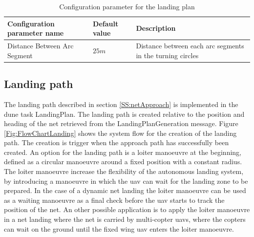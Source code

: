 \begin{table}[H]
\centering
\begin{tabular}{| p{5cm} | p{1cm} | p{5cm} |}
\hline
\textbf{Configuration parameter name}	& \textbf{Default value}	& \textbf{Description} \\ \hline
Distance Between Arc Segment			& $ 25 m$					& Distance between each arc segments in the turning circles \\ \hline
\end{tabular}
\caption{Configuration parameter for the landing plan}
\label{Tb:LandingPlanParameter}
\end{table}
\subsection{Landing path}
The landing path described in section \ref{SS:netApproach} is implemented in the \gls{dune} task LandingPlan. The landing path is created relative to the position and heading of the net retrieved from the LandingPlanGeneration message. Figure \ref{Fig:FlowChartLanding} shows the system flow for the creation of the landing path. The creation is trigger when the approach path has successfully been created. An option for the landing path is a loiter manoeuvre at the beginning, defined as a circular manoeuvre around a fixed position with a constant radius. The loiter manoeuvre increase the flexibility of the autonomous landing system, by introducing a manoeuvre in which the \gls{uav} can wait for the landing zone to be prepared. In the case of a dynamic net landing the loiter manoeuvre can be used as a waiting manoeuvre as a final check before the \gls{uav} starts to track the position of the net. An other possible application is to apply the loiter manoeuvre in a net landing where the net is carried by multi-copter \glspl{uav}, where the copters can wait on the ground until the fixed wing \gls{uav} enters the loiter manoeuvre.
\newpage

